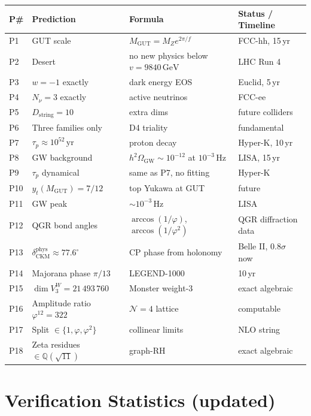 \begin{longtable}{llll}
  \hline
  \textbf{P\#} & \textbf{Prediction} &
  \textbf{Formula} & \textbf{Status / Timeline} \\
  \hline
  P1  & GUT scale & $M_{\mathrm{GUT}}=M_Ze^{2\pi/f}$ & FCC-hh, 15\,yr \\
  P2  & Desert & no new physics below $v=9840\,\mathrm{GeV}$ & LHC Run 4 \\
  P3  & $w=-1$ exactly & dark energy EOS & Euclid, 5\,yr \\
  P4  & $N_\nu=3$ exactly & active neutrinos & FCC-ee \\
  P5  & $D_\mathrm{string}=10$ & extra dims & future colliders \\
  P6  & Three families only & D4 triality & fundamental \\
  P7  & $\tau_p\approx10^{52}\,\mathrm{yr}$ & proton decay & Hyper-K, 10\,yr \\
  P8  & GW background & $h^2\Omega_{\mathrm{GW}}\sim10^{-12}$ at $10^{-3}\,\mathrm{Hz}$ & LISA, 15\,yr \\
  P9  & $\tau_p$ dynamical & same as P7, no fitting & Hyper-K \\
  P10 & $y_t(M_{\mathrm{GUT}})=7/12$ & top Yukawa at GUT & future \\
  P11 & GW peak & $\sim10^{-3}\,\mathrm{Hz}$ & LISA \\
  P12 & QGR bond angles & $\arccos(1/\varphi)$, $\arccos(1/\varphi^2)$ & QGR diffraction data \\
  P13 & $\delta_{\mathrm{CKM}}^{\mathrm{phys}}\approx77.6^\circ$ & CP phase from holonomy & Belle II, $0.8\sigma$ now \\
  P14 & Majorana phase $\pi/13$ & LEGEND-1000 & 10\,yr \\
  P15 & $\dim V^W_3=21\,493\,760$ & Monster weight-3 & exact algebraic \\
  P16 & Amplitude ratio $\varphi^{12}=322$ & $\mathcal{N}=4$ lattice & computable \\
  P17 & Split $\in\{1,\varphi,\varphi^2\}$ & collinear limits & NLO string \\
  P18 & Zeta residues $\in\mathbb{Q}(\sqrt{11})$ & graph-RH & exact algebraic \\
  \hline
\end{longtable}

\section{Verification Statistics (updated)}
\label{sec:verification_updated}

